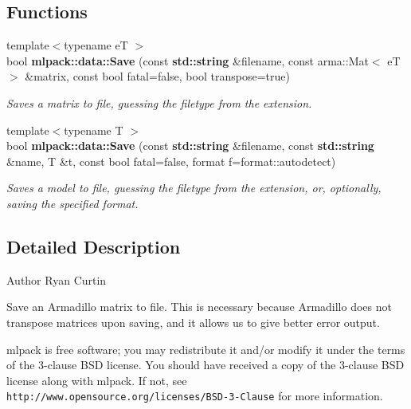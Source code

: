 \subsection*{Functions}
\begin{DoxyCompactItemize}
\item 
{\footnotesize template$<$typename eT $>$ }\\bool {\bf mlpack\+::data\+::\+Save} (const {\bf std\+::string} \&filename, const arma\+::\+Mat$<$ eT $>$ \&matrix, const bool fatal=false, bool transpose=true)
\begin{DoxyCompactList}\small\item\em Saves a matrix to file, guessing the filetype from the extension. \end{DoxyCompactList}\item 
{\footnotesize template$<$typename T $>$ }\\bool {\bf mlpack\+::data\+::\+Save} (const {\bf std\+::string} \&filename, const {\bf std\+::string} \&name, T \&t, const bool fatal=false, format f=format\+::autodetect)
\begin{DoxyCompactList}\small\item\em Saves a model to file, guessing the filetype from the extension, or, optionally, saving the specified format. \end{DoxyCompactList}\end{DoxyCompactItemize}


\subsection{Detailed Description}
\begin{DoxyAuthor}{Author}
Ryan Curtin
\end{DoxyAuthor}
Save an Armadillo matrix to file. This is necessary because Armadillo does not transpose matrices upon saving, and it allows us to give better error output.

mlpack is free software; you may redistribute it and/or modify it under the terms of the 3-\/clause B\+SD license. You should have received a copy of the 3-\/clause B\+SD license along with mlpack. If not, see {\tt http\+://www.\+opensource.\+org/licenses/\+B\+S\+D-\/3-\/\+Clause} for more information. 